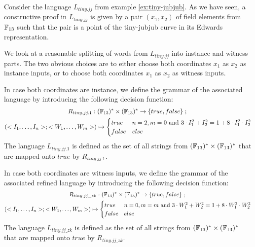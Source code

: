 \begin{example}
\label{ex:tiny-jubjub-instance-witness}
 Consider the language $L_{tiny.jj}$ from example \ref{ex:tiny-jubjub}. As we have seen, a constructive proof in $L_{tiny.jj}$ is given by a pair $(x_1,x_2)$ of field elements from $\mathbb{F}_{13}$ such that the pair is a point of the tiny-jubjub curve in its Edwards representation.

We look at a reasonable splitting of words from $L_{tiny.jj}$ into instance and witness parts. The two obvious choices are to either choose both coordinates $x_1$ as $x_2$ as instance inputs, or to choose both coordinates $x_1$ as $x_2$ as witness inputs. 

In case both coordinates are instance, we define the grammar of the associated language by introducing the following decision function:
\begin{multline*}
R_{tiny.jj.1} : (\mathbb{F}_{13})^*\times (\mathbb{F}_{13})^* \to \{true, false\}\;;\;\\
(<I_1,\ldots,I_n>;<W_1,\ldots,W_m>) \mapsto
\begin{cases}
true & n=2, m=0 \text{ and } 3\cdot I_1^2 + I_2^2 = 1+ 8\cdot I_1^2\cdot I_2^2\\
false & else
\end{cases}
\end{multline*}
The language $L_{tiny.jj.1}$ is defined as the set of all strings from $(\mathbb{F}_{13})^*\times (\mathbb{F}_{13})^*$ that are mapped onto $true$ by $R_{tiny.jj.1}$. 

In case both coordinates are witness inputs, we define the grammar of the associated refined language by introducing the following decision function:
\begin{multline*}
R_{tiny.jj\_zk} : (\mathbb{F}_{13})^*\times (\mathbb{F}_{13})^* \to \{true, false\}\;;\;\\
(<I_1,\ldots,I_n>;<W_1,\ldots,W_m>) \mapsto
\begin{cases}
true & n=0, m=m \text{ and } 3\cdot W_1^2 + W_2^2 = 1+ 8\cdot W_1^2\cdot W_2^2\\
false & else
\end{cases}
\end{multline*}
The language $L_{tiny.jj\_zk}$ is defined as the set of all strings from $(\mathbb{F}_{13})^*\times (\mathbb{F}_{13})^*$ that are mapped onto $true$ by $R_{tiny.jj\_zk}$. 
\end{example}
